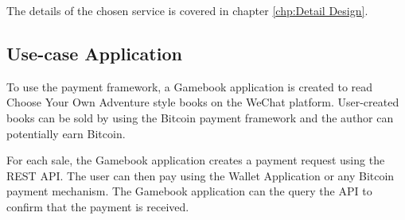 The details of the chosen service is covered in chapter \ref{chp:Detail Design}.

\subsection{Use-case Application}

To use the payment framework, a Gamebook application is created to read Choose Your Own Adventure style books on the WeChat platform. User-created books can be sold by using the Bitcoin payment framework and the author can potentially earn Bitcoin.

For each sale, the Gamebook application creates a payment request using the REST API. The user can then pay using the Wallet Application or any Bitcoin payment mechanism. The Gamebook application can the query the API to confirm that the payment is received. 